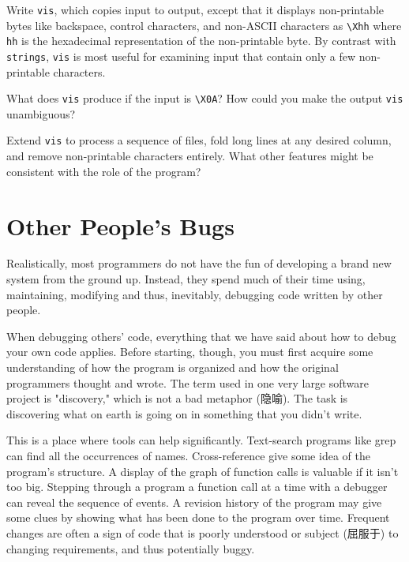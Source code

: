 \begin{exercise}
    Write \verb'vis', which copies input to output, except that it displays
    non-printable bytes like backspace, control characters, and non-ASCII
    characters as \verb'\Xhh' where \verb'hh' is the hexadecimal
    representation of the non-printable byte. By contrast with
    \verb'strings', \verb'vis' is most useful for examining input that
    contain only a few non-printable characters.
\end{exercise}

\begin{exercise}
    What does \verb'vis' produce if the input is \verb'\X0A'? How could you
    make the output \verb'vis' unambiguous?
\end{exercise}

\begin{exercise}
    Extend \verb'vis' to process a sequence of files, fold long lines at
    any desired column, and remove non-printable characters entirely.
    What other features might be consistent with the role of the program?
\end{exercise}

\section{Other People's Bugs}

Realistically, most programmers do not have the fun of developing a brand
new system from the ground up. Instead, they spend much of their time
using, maintaining, modifying and thus, inevitably, debugging code written
by other people.

When debugging others' code, everything that we have said about how to
debug your own code applies. Before starting, though, you must first
acquire some understanding of how the program is organized and how the
original programmers thought and wrote. The term used in one very large
software project is "discovery," which is not a bad metaphor (隐喻). The
task is discovering what on earth is going on in something that you didn't
write.

This is a place where tools can help significantly. Text-search programs
like grep can find all the occurrences of names. Cross-reference give
some idea of the program's structure. A display of the graph of function
calls is valuable if it isn't too big. Stepping through a program a
function call at a time with a debugger can reveal the sequence of events.
A revision history of the program may give some clues by showing what has
been done to the program over time. Frequent changes are often a sign of
code that is poorly understood or subject (屈服于) to changing
requirements, and thus potentially buggy.

